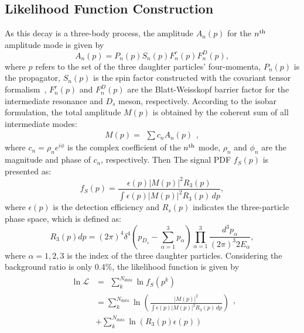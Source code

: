 \documentclass[aps,prd,twocolumn,showpacs,amsmath,amssymb]{revtex4-1}
\begin{document}
\subsection{Likelihood Function Construction}
\label{likelihood}
As this decay is a three-body process, the amplitude $A_{n}(p)$ for the $n^{\rm{th}}$ amplitude mode is given by
\begin{equation}
    A_{n}(p) = P_{n}(p)S_{n}(p)F_{n}^{r}(p)F_{n}^{D}(p), \label{base-amplitude}
\end{equation}
where $p$ refers to the set of the three daughter particles' four-momenta, $P_{n}(p)$ is the propagator, $S_{n}(p)$ is the spin factor constructed with the covariant tensor formalism~\cite{covariant-tensors}, 
$F_{n}^{r}(p)$ and $F_{n}^{D}(p)$ are the Blatt-Weisskopf barrier factor for the intermediate resonance and $D_{s}$ meson, respectively.
According to the isobar formulation, the total amplitude $M(p)$ is obtained by the coherent sum of all intermediate modes:
\begin{equation}
M(p)=\begin{matrix}\sum c_{n}A_{n}(p)\end{matrix}, \label{coherent-sum}
\end{equation}
where $c_{n} = \rho_{n}e^{i\phi}$ is the complex coefficient of the $n^{\rm{th}}$ mode, $\rho_{n}$ and $\phi_{n}$ are the magnitude and phase of $c_{n}$, respectively.
Then The signal PDF $f_{S}(p)$ is presented as: 
\begin{equation}
    f_{S}(p) = \frac{\epsilon(p)\left|M(p)\right|^{2}R_{3}(p)}{\int \epsilon(p)\left|M(p)\right|^{2}R_{3}(p)\,dp}, \label{signal-PDF}
\end{equation}
where $\epsilon(p)$ is the detection efficiency and $R_{s}(p)$ indicates the three-particle phase space, which is defined as:
\begin{equation}
    R_{3}(p)dp = (2\pi)^{4}\delta^{4}
    (p_{D_{s}} - \sum_{\alpha=1}^{3}p_{\alpha})
    \prod_{\alpha=1}^{3}\frac{d^{3}p_{\alpha}}{ (2\pi)^{3}2E_{\alpha}}, \label{three-body PHSP}
\end{equation}
where $\alpha = 1, 2, 3$ is the index of the three daughter particles.
Considering the background ratio is only 0.4\%,  the likelihood function is given by
\begin{equation}
    \begin{aligned}    
    \ln{\mathcal{L}}&= \begin{matrix}\sum_{k}^{N_{data}} \ln f_{S}(p^{k})\end{matrix}   \\
                    &= \sum_{k}^{N_{data}}\ln \left( \frac{\left|M(p)\right|^{2}}{\int \epsilon(p)\left|M(p)\right|^{2}R_{3}(p)\,dp}    \right)  \\
                    &+\sum_{k}^{N_{data}}\ln \left( R_{3}(p)\epsilon(p) \right)
    \end{aligned},
    \label{likelihood}
\end{equation}
\end{document}
